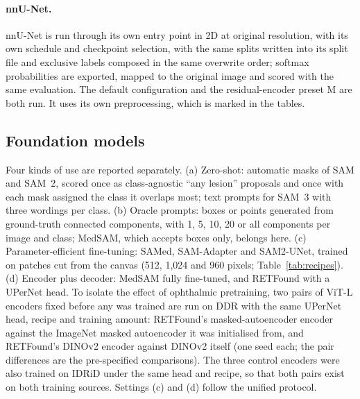 \paragraph{nnU-Net.} nnU-Net is run through its own entry point in 2D at original resolution, with its own schedule and checkpoint selection, with the same splits written into its split file and exclusive labels composed in the same overwrite order; softmax probabilities are exported, mapped to the original image and scored with the same evaluation. The default configuration and the residual-encoder preset M are both run. It uses its own preprocessing, which is marked in the tables.


\subsection{Foundation models}
Four kinds of use are reported separately. (a) Zero-shot: automatic masks of SAM and SAM~2, scored once as class-agnostic ``any lesion'' proposals and once with each mask assigned the class it overlaps most; text prompts for SAM~3 with three wordings per class. (b) Oracle prompts: boxes or points generated from ground-truth connected components, with 1, 5, 10, 20 or all components per image and class; MedSAM, which accepts boxes only, belongs here. (c) Parameter-efficient fine-tuning: SAMed, SAM-Adapter and SAM2-UNet, trained on patches cut from the canvas (512, 1,024 and 960 pixels; Table~\ref{tab:recipes}). (d) Encoder plus decoder: MedSAM fully fine-tuned, and RETFound with a UPerNet head. To isolate the effect of ophthalmic pretraining, two pairs of ViT-L encoders fixed before any was trained are run on DDR with the same UPerNet head, recipe and training amount: RETFound's masked-autoencoder encoder against the ImageNet masked autoencoder it was initialised from, and RETFound's DINOv2 encoder against DINOv2 itself (one seed each; the pair differences are the pre-specified comparisons). The three control encoders were also trained on IDRiD under the same head and recipe, so that both pairs exist on both training sources. Settings (c) and (d) follow the unified protocol.

